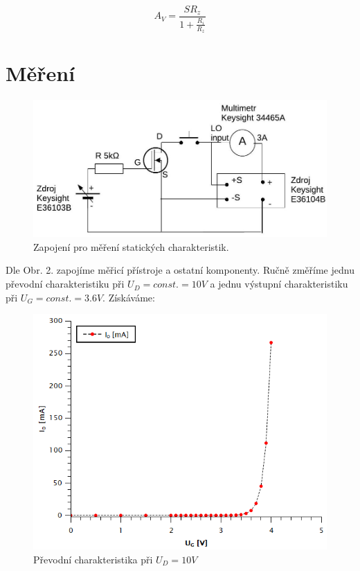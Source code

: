 \documentclass[czech,11pt,a4paper]{article}
\begin{document}
\begin{multicols}{2}
  	\begin{equation}
  		A_V = \frac{SR_z}{1+ \frac{R_i}{R_z}}
  	\end{equation}
  	
	\section{Měření}
		\begin{figure}[H]
		\begin{center}
			
			\includegraphics[width=1\linewidth, ]{zapojeni2} 
			\caption{Zapojení pro měření statických charakteristik.}
		\end{center}		
	\end{figure} 
	Dle Obr. 2. zapojíme měřicí přístroje a ostatní komponenty. Ručně změříme jednu převodní charakteristiku při $U_D=const.=10V$ a jednu výstupní charakteristiku při $U_G=const.=3.6V$. Získáváme:
	\begin{figure}[H]
		\begin{center}			
			\includegraphics[width=0.8\linewidth, ]{prevod1} 
			\caption{Převodní charakteristika při $U_D = 10V$}

\end{center}
\end{figure}
\end{multicols}
\end{document}
